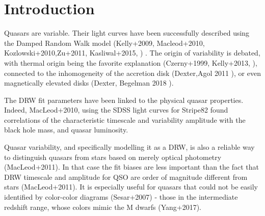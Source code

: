 \documentclass[twocolumn]{aastex62}
\begin{document}

\author[0000-0002-9589-1306]{Krzysztof L. Suberlak}


\author{\v{Z}eljko Ivezi\'c}



\author{Chelsea MacLeod}




\begin{abstract}

\end{abstract}



\section{Introduction}

Quasars are variable.  Their light curves have been successfully described using the Damped Random Walk model (Kelly+2009, Macleod+2010,  Kozlowski+2010,Zu+2011, Kasliwal+2015,   ) . The origin of variability is debated, with thermal origin being the favorite explanation (Czerny+1999,  Kelly+2013, ), connected to the inhomogeneity of the accretion disk (Dexter,Agol 2011 ), or even magnetically elevated disks (Dexter, Begelman 2018 ). 

The DRW fit parameters have been linked to the physical quasar properties. Indeed, MacLeod+2010, using the SDSS light curves for Stripe82  found correlations of the characteristic timescale and variability amplitude  with the black hole mass, and quasar luminosity. 

Quasar variability, and specifically modelling it as  a DRW, is also a reliable way to distinguish quasars from stars based on merely optical photometry (MacLeod+2011).  In that case the fit biases are less important than the fact that DRW timescale and amplitude for QSO are order of  magnitude different from stars (MacLeod+2011).  It is especially useful for quasars that could not be easily identified by color-color diagrams (Sesar+2007) - those in the intermediate redshift range, whose colors mimic the M dwarfs (Yang+2017).  
\end{document}
